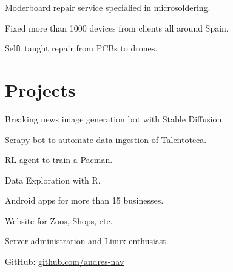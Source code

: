 \documentclass[]{cv}
\begin{document}
\begin{minipage}[t]{0.60\textwidth}
\begin{tightemize}
\item Moderboard repair service specialied in microsoldering.
\item Fixed more than 1000 devices from clients all around Spain.
\item Selft taught repair from PCBs to drones.
\end{tightemize}

\vspace{-\topsep}
\section{Projects}

\locationright{}
\begin{tightemize}
\item Breaking news image generation bot with Stable Diffusion.
\item Scrapy bot to automate data ingestion of Talentoteca.
\item RL agent to train a Pacman.
\item Data Exploration with R.
\end{tightemize}

\locationright{}
\begin{tightemize}
\item Android apps for more than 15 businesses.
\item Website for Zoos, Shops, etc. 
\item Server administration and Linux enthusiast.
\end{tightemize}
\sectionsep

\vspace{-\topsep}
GitHub: \href{https://www.github.com/andres-nav}{github.com/andres-nav}



%
%

\end{minipage} 
\end{document}
